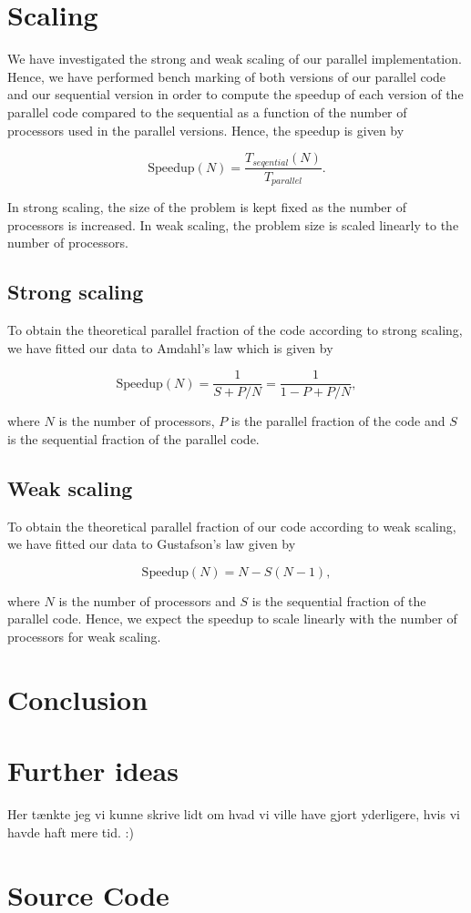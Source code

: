 \documentclass{article}
\begin{document}
\section{Scaling}

We have investigated the strong and weak scaling of our parallel implementation. Hence, we have performed bench marking of both versions of our parallel code and our sequential version in order to compute the speedup of each version of the parallel code compared to the sequential as a function of the number of processors used in the parallel versions. Hence, the speedup is given by

\begin{equation}
    \text{Speedup}(N) = \frac{T_{seqential}(N)}{T_{parallel}}.
\end{equation}

In strong scaling, the size of the problem is kept fixed as the number of processors is increased. In weak scaling, the problem size is scaled linearly to the number of processors.

\subsection{Strong scaling}
To obtain the theoretical parallel fraction of the code according to strong scaling, we have fitted our data to Amdahl's law which is given by

\begin{equation}
    \text{Speedup}(N) = \frac{1}{S+P/N} = \frac{1}{1-P+P/N},
\end{equation}

where $N$ is the number of processors, $P$ is the parallel fraction of the code and $S$ is the sequential fraction of the parallel code.

\subsection{Weak scaling}

To obtain the theoretical parallel fraction of our code according to weak scaling, we have fitted our data to Gustafson's law given by

\begin{equation}
    \text{Speedup}(N) = N - S(N-1),
\end{equation}

where $N$ is the number of processors and $S$ is the sequential fraction of the parallel code. Hence, we expect the speedup to scale linearly with the number of processors for weak scaling.

\section{Conclusion}

\section{Further ideas}
Her tænkte jeg vi kunne skrive lidt om hvad vi ville have gjort yderligere, hvis vi havde haft mere tid. :)

\section{Source Code}
\label{sec:source}

\printbibliography
\end{document}
